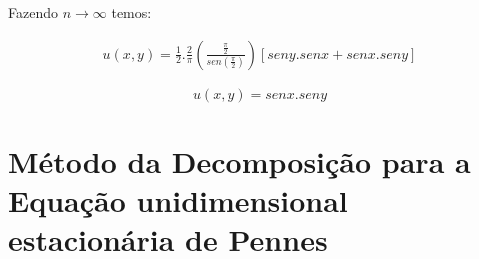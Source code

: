 Fazendo $n\rightarrow \infty$ temos:

\begin{gather}
u(x,y) = \frac{1}{2}.\frac{2}{\pi}\left(\frac{\frac{\pi}{2}}{sen(\frac{\pi}{2})}\right)\left[seny.senx + senx.seny\right]
\end{gather}

\begin{displaymath}
u(x,y) = senx.seny
\end{displaymath}





\chapter[Método da Decomposição para a  equação unidimensional estacionária de Pennes]{Método da Decomposição para a  Equação unidimensional estacionária de Pennes}

